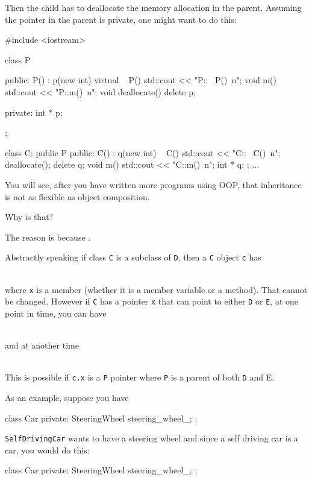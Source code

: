\begin{console}
Then the child has to deallocate the memory allocation in the parent.
Assuming the pointer in the parent is private, one might want to do
this:

\begin{console}
#include <iostream>

class P
{
public:
     P() : p(new int) {}
     virtual ~ P() { std::cout << "P::~ P()\ n"; }
     void m() { std::cout << "P::m()\ n"; }
     void deallocate() { delete p; }
     
private:
     int * p;
};

class C: public P
{
public:
     C() : q(new int) {}
     ~ C()
     {
         std::cout << "C::~ C()\ n";
         deallocate();
         delete q;
     }   
     void m() { std::cout << "C::m()\ n"; }
     int * q;
};
... 
\end{console}

\newpage{}

You will see, after you have written more programs using OOP, that inheritance is not as flexible as object composition.

Why is that?

The reason is because .

Abstractly speaking if class \texttt{C} is a subclass of \texttt{D}, then a
\texttt{C} object \texttt{c} has

\\

where \texttt{x} is a member (whether it is a member variable or a
method). That cannot be changed. However if \texttt{C} has a pointer
\texttt{x} that can point to either \texttt{D} or \texttt{E}, at one point in
time, you can have

\\

and at another time

\\

This is possible if \texttt{c.x} is a \texttt{P} pointer where \texttt{P} is a
parent of both \texttt{D} and E.

As an example, suppose you have
\begin{console}
class Car
{
private:
     SteeringWheel steering_wheel_;
};
\end{console}
\texttt{SelfDrivingCar} wants to have a steering wheel and since a self driving car is a car, you would do this:
\begin{console}
class Car
{
private:
     SteeringWheel steering_wheel_;
};


\end{console}
\end{console}
